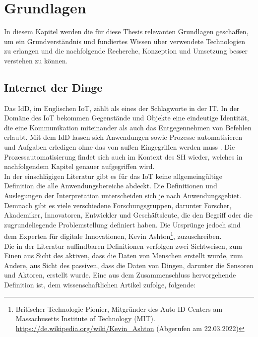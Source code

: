 \chapter{Grundlagen}
\label{chap:grundlagen}
    In diesem Kapitel werden die für diese Thesis relevanten Grundlagen geschaffen, um ein Grundverständnis und 
    fundiertes Wissen über verwendete Technologien zu erlangen und die nachfolgende Recherche, Konzeption und 
    Umsetzung besser verstehen zu können. 

\section{Internet der Dinge}
\label{sec:iot}
    Das \ac{IdD}, im Englischen \ac{IoT}, zählt als eines der Schlagworte in der \ac{IT}. In der Domäne des \acs{IoT} bekommen 
    Gegenstände und Objekte eine eindeutige Identität, die eine Kommunikation miteinander als auch das Entgegennehmen von 
    Befehlen erlaubt. Mit dem \acl{IdD} lassen sich Anwendungen sowie Prozesse automatisieren und Aufgaben erledigen ohne das 
    von außen Eingegriffen werden muss \cite{bigdatainsider2016}. Die Prozessautomatisierung findet sich auch im Kontext des 
    \acl{SH} wieder, welches in nachfolgendem Kapitel genauer aufgegriffen wird. 
    \\
    \linebreak
    In der einschlägigen Literatur gibt es für das \acl{IoT} keine allgemeingültige Definition die alle Anwendungsbereiche abdeckt. 
    Die Definitionen und Auslegungen der Interpretation unterscheiden sich je nach Anwendungsgebiet. Demnach gibt es viele verschiedene 
    Forschungsgruppen, darunter Forscher, Akademiker, Innovatoren, Entwickler und Geschäftsleute, die den Begriff oder die zugrundeliegende 
    Problemstellung definiert haben. Die Ursprünge jedoch sind dem Experten für digitale Innovationen, 
    Kevin Ashton\footnote{Britischer Technologie-Pionier, Mitgründer des Auto-ID Centers am Massachusetts Institute of Technology (MIT). \url{https://de.wikipedia.org/wiki/Kevin_Ashton} (Abgerufen am 22.03.2022)}, 
    zuzuschreiben. 
    \\ 
    Die in der Literatur auffindbaren Definitionen verfolgen zwei Sichtweisen, zum Einen aus Sicht des aktiven, dass die Daten von 
    Menschen erstellt wurde, zum Andere, aus Sicht des passiven, dass die Daten von Dingen, darunter die Sensoren und Aktoren, 
    erstellt wurde. \cite{Madakam2015} Eine aus dem Zusammenschluss hervorgehende Definition ist, dem wissenschaftlichen Artikel zufolge, folgende:
